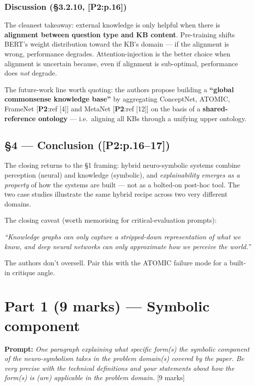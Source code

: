 \documentclass[11pt, a4paper]{article}
\newcommand{\paperref}[1]{\textcolor{srcBd}{\small[\textbf{P2}:#1]}}
\begin{document}
\subsubsection*{Discussion (§3.2.10, \paperref{p.16})}
The cleanest takeaway: external knowledge is only helpful when there is \textbf{alignment between question type and KB content}. Pre-training shifts BERT's weight distribution toward the KB's domain — if the alignment is wrong, performance degrades. Attention-injection is the better choice when alignment is uncertain because, even if alignment is sub-optimal, performance does \emph{not} degrade.

The future-work line worth quoting: the authors propose building a \textbf{``global commonsense knowledge base''} by aggregating ConceptNet, ATOMIC, FrameNet \paperref{ref [4]} and MetaNet \paperref{ref [12]} on the basis of a \textbf{shared-reference ontology} — i.e.\ aligning all KBs through a unifying upper ontology.

\subsection{§4 — Conclusion (\paperref{p.16--17})}

The closing returns to the §1 framing: hybrid neuro-symbolic systems combine perception (neural) and knowledge (symbolic), and \emph{explainability emerges as a property} of how the systems are built — not as a bolted-on post-hoc tool. The two case studies illustrate the same hybrid recipe across two very different domains.

The closing caveat (worth memorising for critical-evaluation prompts):

\begin{exbox}[Quote (\paperref{end of §4, p.17})]
\emph{``Knowledge graphs can only capture a stripped-down representation of what we know, and deep neural networks can only approximate how we perceive the world.''}
\end{exbox}

The authors don't oversell. Pair this with the ATOMIC failure mode for a built-in critique angle.

\section{Part 1 (9 marks) — Symbolic component}

\textbf{Prompt:} \emph{One paragraph explaining what specific form(s) the symbolic component of the neuro-symbolism takes in the problem domain(s) covered by the paper. Be very precise with the technical definitions and your statements about how the form(s) is (are) applicable in the problem domain.} [9 marks]
\end{document}
